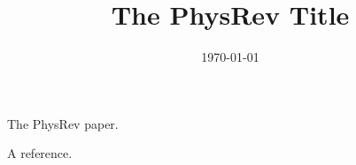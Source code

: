 \documentclass[aps,prl,showpacs,showkeys,amsmath,amssymb,
twocolumn,floatfix,superscriptaddress]{revtex4-1}
\begin{document}
\title{The PhysRev Title}



\noaffiliation
\date{\today}

\begin{abstract}
\end{abstract}

\maketitle

The PhysRev paper.

A reference.~\cite{Ahmad:2001an} 

 

\end{document}
